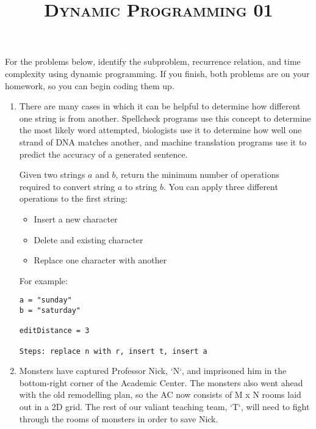 \documentclass{article}
\title{\large{\textsc{Dynamic Programming 01}}}
\date{}
\begin{document}
\maketitle

\subsection*{}


For the problems below, identify the subproblem, recurrence relation, and time complexity using dynamic programming. If you finish, both problems are on your homework, so you can begin coding them up.


\begin{enumerate}

\item There are many cases in which it can be helpful to determine how different one string is from another.  Spellcheck programs use this concept to determine the most likely word attempted, biologists use it to determine how well one strand of DNA matches another, and machine translation programs use it to predict the accuracy of a generated sentence. 

Given two strings $a$ and $b$, return the minimum number of operations required to convert string $a$ to string $b$. You can apply three different operations to the first string:

\begin{itemize}
    \item Insert a new character
    \item Delete and existing character
    \item Replace one character with another
\end{itemize}

For example: 

\begin{lstlisting}
a = "sunday"
b = "saturday"

editDistance = 3

Steps: replace n with r, insert t, insert a 
\end{lstlisting}

\item Monsters have captured Professor Nick, `N`, and imprisoned him in the bottom-right corner of the Academic Center.  The monsters also went ahead with the old remodelling plan, so the AC now consists of M x N rooms laid out in a 2D grid.  The rest of our valiant teaching team, `T`, will need to fight through the rooms of monsters in order to save Nick.  


\end{enumerate}
\end{document}

